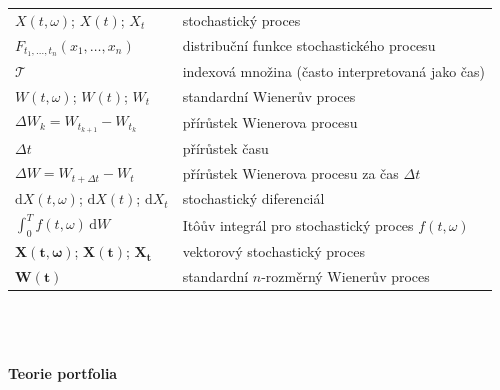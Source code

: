 \documentclass[a4paper,12pt]{report}
\theoremstyle{definition} \newtheorem{definice}[veta]{Definice}
\theoremstyle{remark}
\begin{document}
   \begin{tabular}{p{4cm} p{9.3cm}}
     $X(t,\omega)$; $X(t)$; $X_t$                       &   stochastický proces \\
   $F_{t_1,\dots,t_n}(x_1,\dots,x_n)$                       &  distribuční funkce stochastického procesu \\
   $\mathcal{T}$					& indexová množina (často interpretovaná jako čas)\\
   $W(t,\omega)$; $W(t)$; $W_t$                       &   standardní Wienerův proces \\
   $\Delta W_k=W_{t_{k+1}}-W_{t_k}$				 &   přírůstek Wienerova procesu \\
   $\Delta t$						& přírůstek času \\
   $\Delta W=W_{t+\Delta t}-W_{t}$				 &   přírůstek Wienerova procesu za čas $\Delta t$\\
   $\mathrm{d}X(t,\omega)$; $\mathrm{d}X(t)$; $\mathrm{d}X_t$    &  stochastický diferenciál \\ %
   $\int_0^Tf(t,\omega)\,\mathrm{d}W$                              &   It\^oův integrál pro stochastický proces $f(t,\omega)$ \\
   $\boldsymbol{X}(\boldsymbol{t},\boldsymbol{\omega})$; $\boldsymbol{X}(\boldsymbol{t})$; $\boldsymbol{X}_{\boldsymbol{t}}$  		& vektorový stochastický proces\\
   $\boldsymbol{W}(\boldsymbol{t})$ 		& standardní $n$-rozměrný Wienerův proces\\
   \end{tabular}\\\\\\
%
%
\newpage \noindent
\textbf{Teorie portfolia}\\\\
\end{document}

